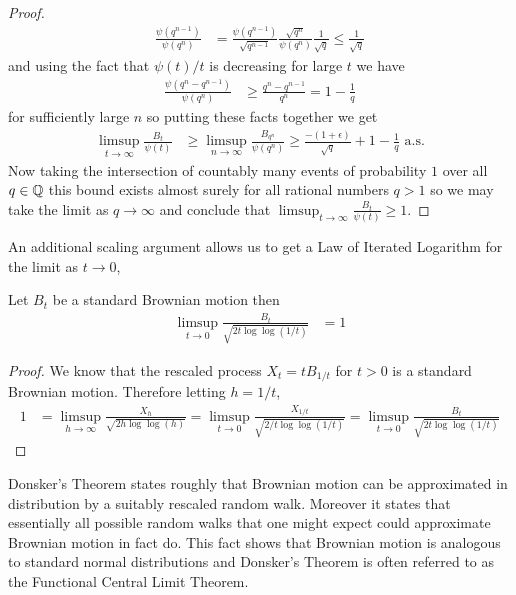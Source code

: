 \begin{proof}
\begin{align*}
\frac{\psi(q^{n-1})}{\psi(q^n)} &=
\frac{\psi(q^{n-1})}{\sqrt{q^{n-1}}}
\frac{\sqrt{q^n}}{\psi(q^n)}\frac{1}{\sqrt{q}} \leq \frac{1}{\sqrt{q}} 
\end{align*}
and using the fact that $\psi(t)/t$ is decreasing for large $t$ we have 
\begin{align*}
\frac{\psi(q^n- q^{n-1})}{\psi(q^n)} &\geq \frac{q^n - q^{n-1}}{q^n} =
1 - \frac{1}{q}
\end{align*}
for sufficiently large $n$ so putting these facts together we get 
\begin{align*}
\limsup_{t \to \infty} \frac{B_t}{\psi(t)} &\geq \limsup_{n \to
  \infty} \frac{B_{q^n}}{\psi(q^n)} \geq
\frac{-(1+\epsilon)}{\sqrt{q}} + 1 - \frac{1}{q} \text{ a.s.}
\end{align*}
Now taking the intersection of countably many events of probability
$1$ over all $q \in \mathbb{Q}$ this bound exists almost surely for
all rational numbers $q > 1$ so we may take the limit as $q \to
\infty$ and conclude that $\limsup_{t \to \infty} \frac{B_t}{\psi(t)}
\geq 1$.
\end{proof}
An additional scaling argument allows us to get a Law of Iterated
Logarithm for the limit as $t \to 0$,
\begin{cor}Let $B_t$ be a standard Brownian motion then 
\begin{align*}
\limsup_{t \to 0} \frac{B_t}{\sqrt{2 t \log \log (1/t)}} &= 1
\end{align*}
\end{cor}
\begin{proof}
We know that the rescaled process $X_t = t B_{1/t}$ for $t > 0$ is a
standard Brownian motion.  Therefore letting $h = 1/t$,
\begin{align*}
1 &= \limsup_{h \to \infty} \frac{X_h}{\sqrt{2 h \log \log (h)}} =
\limsup_{t \to 0} \frac{X_{1/t}}{\sqrt{2/t \log \log (1/t)}} =
\limsup_{t \to 0} \frac{B_t}{\sqrt{2 t \log \log (1/t)}}
\end{align*}
\end{proof}

Donsker's Theorem states roughly that Brownian motion can be
approximated in distribution by a suitably rescaled random walk.
Moreover it states that essentially all possible random walks that one
might expect could approximate Brownian motion in fact do.  This fact
shows that Brownian motion is analogous to standard normal
distributions and Donsker's Theorem is often referred to as the
Functional Central Limit Theorem.

